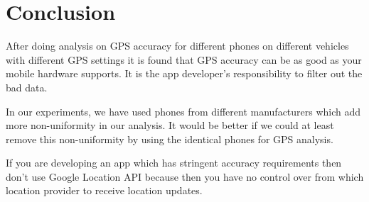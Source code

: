 \documentclass[12pt]{report}
\begin{document}


\chapter{Conclusion}
\label{conclusion}
After doing analysis on GPS accuracy for different phones on different
  vehicles with different GPS settings it is found that GPS accuracy can be as
  good as your mobile hardware supports. It is the app developer's
  responsibility to filter out the bad data.



  In our experiments, we have used phones from different manufacturers which
  add more non-uniformity in our analysis. It would be better if we could at
  least remove this non-uniformity by using the identical phones for GPS
  analysis.

  If you are developing an app which has stringent accuracy requirements then
  don't use Google Location API \cite[]{google_location_api} because then you
  have no control over from which location provider to receive location updates.

 


\end{document}

